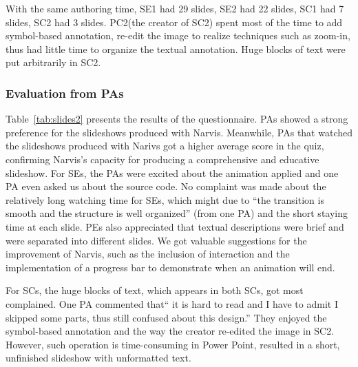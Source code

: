 With the same authoring time, SE1 had 29 slides, SE2 had 22 slides, SC1 had 7 slides, SC2 had 3 slides. PC2(the creator of SC2) spent most of the time to add symbol-based annotation, re-edit the image to realize techniques such as zoom-in, thus had little time to organize the textual annotation. Huge blocks of text were put arbitrarily in SC2.



\subsubsection{Evaluation from PAs}

Table~\ref{tab:slides2} presents the results of the questionnaire. PAs showed a strong preference for the slideshows produced with Narvis. Meanwhile,  PAs that watched the slideshows produced with Narivs got a higher average score in the quiz, confirming Narvis's capacity for producing a comprehensive and educative slideshow. 
For SEs, the PAs were excited about the animation applied and one PA even asked us about the source code. No complaint was made about the relatively long watching time for SEs, which might due to ``the transition is smooth and the structure is well organized'' (from one PA) and the short staying time at each slide. PEs also appreciated that textual descriptions were brief and were separated into different slides.
We got valuable suggestions for the improvement of Narvis, such as the inclusion of interaction and the implementation of a progress bar to demonstrate when an animation will end. 

For SCs, the huge blocks of text, which appears in both SCs, got most complained. 
One PA commented that`` it is hard to read and I have to admit I skipped some parts, thus still confused about this design.'' They enjoyed the symbol-based annotation and the way the creator re-edited the image in SC2. However, such operation is time-consuming in Power Point, resulted in a short, unfinished slideshow with unformatted text. 



